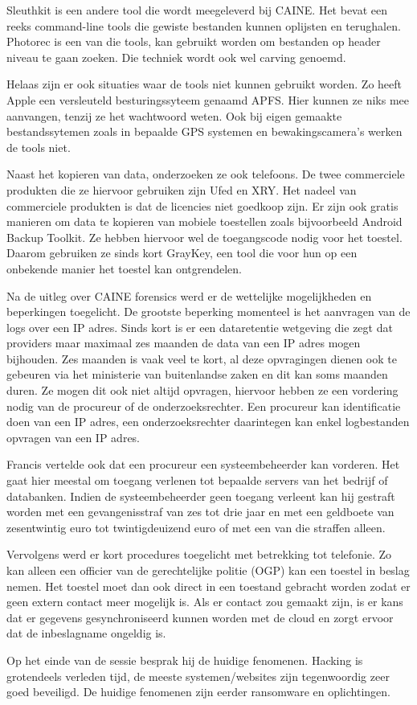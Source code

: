 \clearpage

Sleuthkit is een andere tool die wordt meegeleverd bij CAINE. Het bevat een reeks command-line tools
die gewiste bestanden kunnen oplijsten en terughalen. Photorec is een van die tools, kan gebruikt
worden om bestanden op header niveau te gaan zoeken. Die techniek wordt ook wel carving genoemd.

Helaas zijn er ook situaties waar de tools niet kunnen gebruikt worden. Zo heeft Apple een
versleuteld besturingssyteem genaamd APFS. Hier kunnen ze niks mee aanvangen, tenzij ze het
wachtwoord weten. Ook bij eigen gemaakte bestandssytemen zoals in bepaalde GPS systemen en
bewakingscamera's werken de tools niet.

Naast het kopieren van data, onderzoeken ze ook telefoons. De twee commerciele produkten die ze
hiervoor gebruiken zijn Ufed en XRY. Het nadeel van commerciele produkten is dat de licencies niet
goedkoop zijn. Er zijn ook gratis manieren om data te kopieren van mobiele toestellen zoals
bijvoorbeeld Android Backup Toolkit. Ze hebben hiervoor wel de toegangscode nodig voor het toestel.
Daarom gebruiken ze sinds kort GrayKey, een tool die voor hun op een onbekende manier het toestel
kan ontgrendelen.

Na de uitleg over CAINE forensics werd er de wettelijke mogelijkheden en beperkingen toegelicht. De
grootste beperking momenteel is het aanvragen van de logs over een IP adres. Sinds kort is er een
dataretentie wetgeving die zegt dat providers maar maximaal zes maanden de data van een IP adres
mogen bijhouden. Zes maanden is vaak veel te kort, al deze opvragingen dienen ook te gebeuren via
het ministerie van buitenlandse zaken en dit kan soms maanden duren. Ze mogen dit ook niet altijd
opvragen, hiervoor hebben ze een vordering nodig van de procureur of de onderzoeksrechter. Een
procureur kan identificatie doen van een IP adres, een onderzoeksrechter daarintegen kan enkel
logbestanden opvragen van een IP adres. 

Francis vertelde ook dat een procureur een systeembeheerder kan vorderen. Het gaat hier meestal om
toegang verlenen tot bepaalde servers van het bedrijf of databanken. Indien de systeembeheerder geen
toegang verleent kan hij gestraft worden met een gevangenisstraf van zes tot drie jaar en met een
geldboete van zesentwintig euro tot twintigdeuizend euro of met een van die straffen alleen.

Vervolgens werd er kort procedures toegelicht met betrekking tot telefonie. Zo kan alleen een
officier van de gerechtelijke politie (OGP) kan een toestel in beslag nemen. Het toestel moet dan
ook direct in een toestand gebracht worden zodat er geen extern contact meer mogelijk is. Als er
contact zou gemaakt zijn, is er kans dat er gegevens gesynchroniseerd kunnen worden met de cloud en
zorgt ervoor dat de inbeslagname ongeldig is.

Op het einde van de sessie besprak hij de huidige fenomenen. Hacking is grotendeels verleden tijd,
de meeste systemen/websites zijn tegenwoordig zeer goed beveiligd. De huidige fenomenen zijn eerder
ransomware en oplichtingen.
